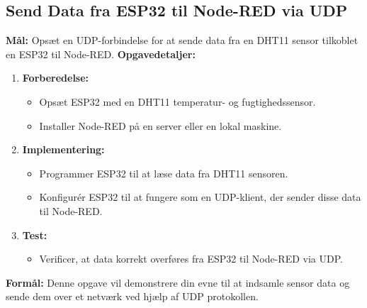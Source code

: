 \documentclass[12pt,a4paper]{book}
\begin{document}
	\subsection*{Send Data fra ESP32 til Node-RED via UDP}
	\textbf{Mål:} Opsæt en UDP-forbindelse for at sende data fra en DHT11 sensor tilkoblet en ESP32 til Node-RED.
	\newline\newline\noindent
	\textbf{Opgavedetaljer:}
	\begin{enumerate}
		\item \textbf{Forberedelse:}
		\begin{itemize}
			\item Opsæt ESP32 med en DHT11 temperatur- og fugtighedssensor.
			\item Installer Node-RED på en server eller en lokal maskine.
		\end{itemize}
		\item \textbf{Implementering:}
		\begin{itemize}
			\item Programmer ESP32 til at læse data fra DHT11 sensoren.
			\item Konfigurér ESP32 til at fungere som en UDP-klient, der sender disse data til Node-RED.
		\end{itemize}
		\item \textbf{Test:}
		\begin{itemize}
			\item Verificer, at data korrekt overføres fra ESP32 til Node-RED via UDP.
		\end{itemize}
	\end{enumerate}
	\textbf{Formål:} Denne opgave vil demonstrere din evne til at indsamle sensor data og sende dem over et netværk ved hjælp af UDP protokollen.
	
\end{document}

